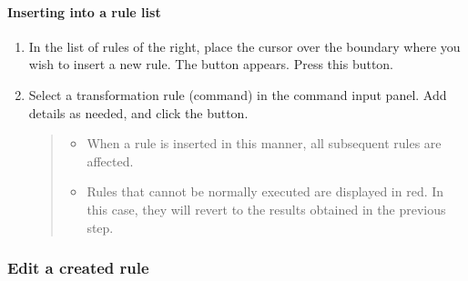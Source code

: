 \documentclass[letterpaper,10pt,english]{sphinxmanual}
\begin{document}
\paragraph{Inserting into a rule list}
\label{\detokenize{discovery/part07/edit_rules:id5}}\begin{enumerate}
\def\theenumi{\arabic{enumi}}
\def\labelenumi{\theenumi .}
\makeatletter\def\p@enumii{\p@enumi \theenumi .}\makeatother
\item {} 
In the list of rules of the right, place the cursor over the boundary where you wish to insert a new rule. The  button appears. Press this button.
\begin{quote}

\begin{figure}[H]
\centering

\noindent{}
\end{figure}
\end{quote}

\item {} 
Select a transformation rule (command) in the command input panel. Add details as needed, and click the  button.
\begin{quote}
\begin{itemize}
\item {} 
When a rule is inserted in this manner, all subsequent rules are affected.

\item {} 
Rules that cannot be normally executed are displayed in red. In this case, they will revert to the results obtained in the previous step.

\end{itemize}

\begin{figure}[H]
\centering

\noindent{}
\end{figure}
\end{quote}

\end{enumerate}


\subsubsection{Edit a created rule}
\label{\detokenize{discovery/part07/edit_rules:id6}}
\end{document}
